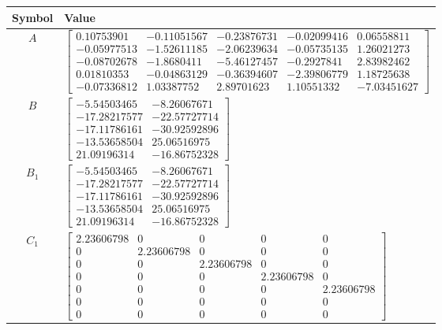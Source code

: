 \begin{tabular}{cl}
\hline
  Symbol  & Value                                                                                                                                                                                                                                                                                                                                                                                 \\
\hline
   $A$    & $\left[\begin{matrix}0.10753901 & -0.11051567 & -0.23876731 & -0.02099416 & 0.06558811\\-0.05977513 & -1.52611185 & -2.06239634 & -0.05735135 & 1.26021273\\-0.08702678 & -1.8680411 & -5.46127457 & -0.2927841 & 2.83982462\\0.01810353 & -0.04863129 & -0.36394607 & -2.39806779 & 1.18725638\\-0.07336812 & 1.03387752 & 2.89701623 & 1.10551332 & -7.03451627\end{matrix}\right]$ \\
   $B$    & $\left[\begin{matrix}-5.54503465 & -8.26067671\\-17.28217577 & -22.57727714\\-17.11786161 & -30.92592896\\-13.53658504 & 25.06516975\\21.09196314 & -16.86752328\end{matrix}\right]$                                                                                                                                                                                                  \\
 $B_{1}$  & $\left[\begin{matrix}-5.54503465 & -8.26067671\\-17.28217577 & -22.57727714\\-17.11786161 & -30.92592896\\-13.53658504 & 25.06516975\\21.09196314 & -16.86752328\end{matrix}\right]$                                                                                                                                                                                                  \\
 $C_{1}$  & $\left[\begin{matrix}2.23606798 & 0 & 0 & 0 & 0\\0 & 2.23606798 & 0 & 0 & 0\\0 & 0 & 2.23606798 & 0 & 0\\0 & 0 & 0 & 2.23606798 & 0\\0 & 0 & 0 & 0 & 2.23606798\\0 & 0 & 0 & 0 & 0\\0 & 0 & 0 & 0 & 0\end{matrix}\right]$                                                                                                                                                             \\

\end{tabular}

